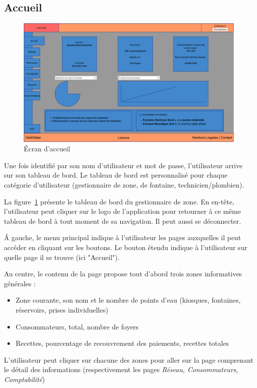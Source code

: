 \documentclass[a4paper, 11pt]{article}
\begin{document}
  \subsection{Accueil}

    \begin{figure}[H]
        \includegraphics[width=\textwidth]{Cahier_des_Charges/accueil}
        \caption{\'Ecran d'accueil}
        \label{fig:zone_dashboard}
    \end{figure}

    Une fois identifié par son nom d'utilisateur et mot de passe, l'utilisateur arrive sur son tableau de bord. Le tableau de bord est personnalisé pour chaque catégorie d'utilisateur (gestionnaire de zone, de fontaine, technicien/plombien).

    La figure~\ref{fig:zone_dashboard} présente le tableau de bord du gestionnaire de zone. En en-tête, l'utilisateur peut cliquer sur le logo de l'application pour retourner à ce même tableau de bord à tout moment de sa navigation. Il peut aussi se déconnecter.

    \'A gauche, le menu principal indique à l'utilisateur les pages auxquelles il peut accéder en cliquant sur les boutons. Le bouton étendu indique à l'utilisateur sur quelle page il se trouve (ici "Accueil").

    Au centre, le contenu de la page propose tout d'abord trois zones informatives générales :
    \begin{itemize}
      \item Zone courante, son nom et le nombre de points d'eau (kiosques, fontaines, réservoirs, prises individuelles)
      \item Consommateurs, total, nombre de foyers
      \item Recettes, pourcentage de recouvrement des paiements, recettes totales
    \end{itemize}
    L'utilisateur peut cliquer sur chacune des zones pour aller sur la page comprenant le détail des informations (respectivement les pages \emph{Réseau, Consommateurs, Comptabilité})
\end{document}
